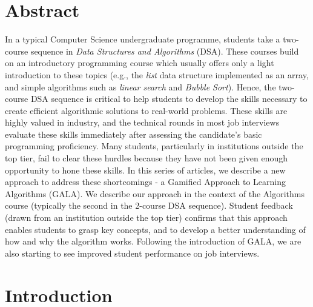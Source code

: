 \begin{multicols}{2}

\section*{Abstract}

In a typical Computer Science undergraduate programme, students take a two-course sequence in \textit{Data Structures and Algorithms} (DSA). These courses build on an introductory programming course which usually offers only a light introduction to these topics (e.g., the \textit{list} data structure implemented as an array, and simple algorithms such as \textit{linear search} and \textit{Bubble Sort}). Hence, the two-course DSA sequence is critical to help students to develop the skills necessary to create efficient algorithmic solutions to real-world problems. These skills are highly valued in industry, and the technical rounds in most job interviews evaluate these skills immediately after assessing the candidate's basic programming proficiency. Many students, particularly in institutions outside the top tier, fail to clear these hurdles because they have not been given enough opportunity to hone these skills. In this series of articles, we describe a new approach to address these shortcomings - a Gamified Approach to Learning Algorithms (GALA). We describe our approach in the context of the Algorithms course (typically the second in the 2-course DSA sequence). Student feedback (drawn from an institution outside the top tier) confirms that this approach enables students to grasp key concepts, and to develop a better understanding of how and why the algorithm works. Following the introduction of GALA, we are also starting to see improved student performance on job interviews.

\vspace{-.3cm}

\section{Introduction}\label{section-1}

\vspace{-.2cm}


\end{multicols}
